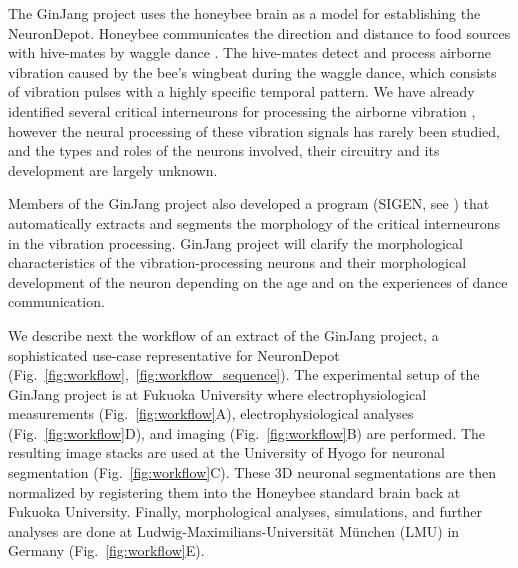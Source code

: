 \documentclass{frontiersSCNS} %
\begin{document}
The GinJang project uses the honeybee brain as a model for establishing the
NeuronDepot. Honeybee communicates the direction and distance to food sources
with hive-mates by waggle dance \citep{Frisch1967}. The hive-mates detect and
process airborne vibration caused by the bee's wingbeat during the waggle
dance, which consists of vibration pulses with a highly specific temporal
pattern. We have already identified several critical interneurons for
processing the airborne vibration \citep{Ai2007, Ai2009, Ai2010, Ai2012,
Ai2013}, however the neural processing of these
vibration signals has rarely been studied, and the types and roles of the
neurons involved, their circuitry and its development are largely unknown. 

Members of the GinJang project also developed a program (SIGEN, see
\citep{Minemoto}) that automatically extracts and segments the morphology of the
critical interneurons in the vibration processing. GinJang project will clarify
the morphological characteristics of the vibration-processing neurons and their
morphological development of the neuron depending on the age and on the
experiences of dance communication.  

We describe next the workflow of an extract of the GinJang project, a
sophisticated use-case representative for NeuronDepot
(Fig.~\ref{fig:workflow},~\ref{fig:workflow_sequence}). The experimental setup
of the GinJang project is at Fukuoka University where electrophysiological
measurements (Fig.~\ref{fig:workflow}A), electrophysiological analyses
(Fig.~\ref{fig:workflow}D), and imaging (Fig.~\ref{fig:workflow}B) are
performed. The resulting image stacks are used at the University of Hyogo for
neuronal segmentation (Fig.~\ref{fig:workflow}C). These 3D neuronal segmentations are then
normalized by registering them into the Honeybee standard brain back at Fukuoka
University. Finally, morphological analyses, simulations, and further analyses
are done at Ludwig-Maximilians-Universität München (LMU) in Germany
(Fig.~\ref{fig:workflow}E).
\end{document}
